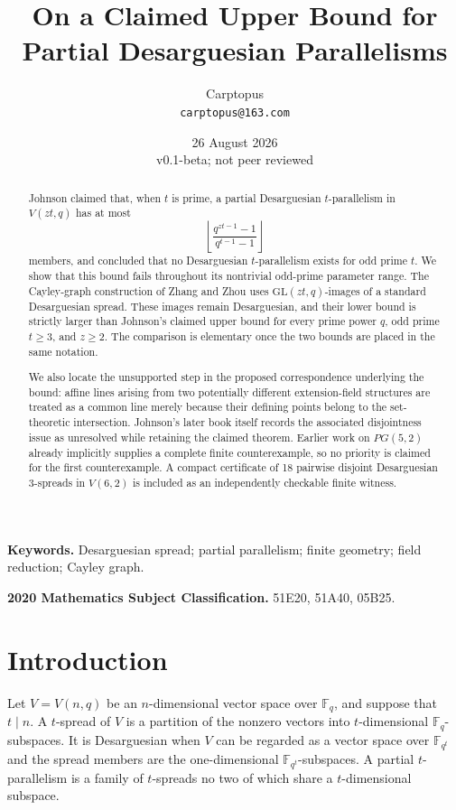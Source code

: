 \documentclass[11pt]{article}
\title{On a Claimed Upper Bound for\\
Partial Desarguesian Parallelisms}
\author{Carptopus\\\small\texttt{carptopus@163.com}}
\date{26 August 2026\\\small v0.1-beta; not peer reviewed}
\newcommand{\F}{\mathbb F}
\begin{document}
\maketitle

\begin{abstract}
Johnson claimed that, when $t$ is prime, a partial Desarguesian
$t$-parallelism in $V(zt,q)$ has at most
\[
\left\lfloor\frac{q^{zt-1}-1}{q^{t-1}-1}\right\rfloor
\]
members, and concluded that no Desarguesian $t$-parallelism exists for odd
prime $t$. We show that this bound fails throughout its nontrivial odd-prime
parameter range. The Cayley-graph construction of Zhang and Zhou uses
$\mathrm{GL}(zt,q)$-images of a standard Desarguesian spread. These images
remain Desarguesian, and their lower bound is strictly larger than Johnson's
claimed upper bound for every prime power $q$, odd prime $t\geq3$, and
$z\geq2$. The comparison is elementary once the two bounds are placed in the
same notation.

We also locate the unsupported step in the proposed correspondence underlying
the bound: affine lines arising from two potentially different extension-field
structures are treated as a common line merely because their defining points
belong to the set-theoretic intersection. Johnson's later book itself records
the associated disjointness issue as unresolved while retaining the claimed
theorem. Earlier work on $PG(5,2)$ already implicitly supplies a complete
finite counterexample, so no priority is claimed for the first counterexample.
A compact certificate of 18 pairwise disjoint Desarguesian $3$-spreads in
$V(6,2)$ is included as an independently checkable finite witness.
\end{abstract}

\noindent\textbf{Keywords.} Desarguesian spread; partial parallelism; finite
geometry; field reduction; Cayley graph.

\medskip
\noindent\textbf{2020 Mathematics Subject Classification.} 51E20, 51A40,
05B25.

\section{Introduction}

Let $V=V(n,q)$ be an $n$-dimensional vector space over $\F_q$, and suppose
that $t\mid n$. A $t$-spread of $V$ is a partition of the nonzero vectors
into $t$-dimensional $\F_q$-subspaces. It is Desarguesian when $V$ can be
regarded as a vector space over $\F_{q^t}$ and the spread members are the
one-dimensional $\F_{q^t}$-subspaces. A partial $t$-parallelism is a family
of $t$-spreads no two of which share a $t$-dimensional subspace.
\end{document}
